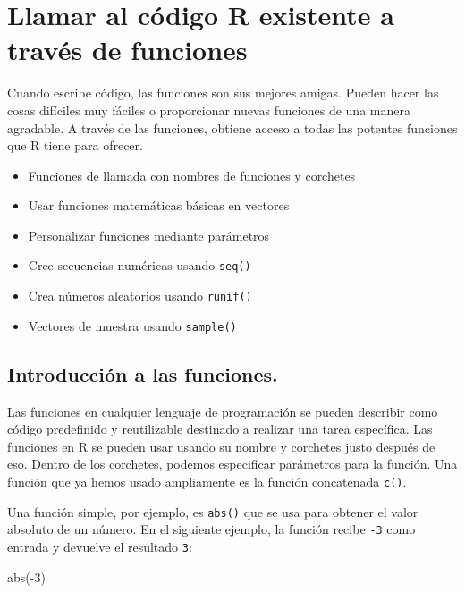 \documentclass[
]{book}
\newenvironment{Shaded}{\begin{snugshade}}{\end{snugshade}}
\newcommand{\DecValTok}[1]{\textcolor[rgb]{0.00,0.00,0.81}{#1}}
\newcommand{\FunctionTok}[1]{\textcolor[rgb]{0.00,0.00,0.00}{#1}}
\newcommand{\NormalTok}[1]{#1}
\newcommand{\SpecialCharTok}[1]{\textcolor[rgb]{0.00,0.00,0.00}{#1}}
\providecommand{\tightlist}{%
  \setlength{\itemsep}{0pt}\setlength{\parskip}{0pt}}
\begin{document}
\hypertarget{llamar-al-cuxf3digo-r-existente-a-travuxe9s-de-funciones}{%
\section{Llamar al código R existente a través de funciones}\label{llamar-al-cuxf3digo-r-existente-a-travuxe9s-de-funciones}}

Cuando escribe código, las funciones son sus mejores amigas. Pueden hacer las cosas difíciles muy fáciles o proporcionar nuevas funciones de una manera agradable. A través de las funciones, obtiene acceso a todas las potentes funciones que R tiene para ofrecer.

\begin{itemize}
\tightlist
\item
  Funciones de llamada con nombres de funciones y corchetes
\item
  Usar funciones matemáticas básicas en vectores
\item
  Personalizar funciones mediante parámetros
\item
  Cree secuencias numéricas usando \texttt{seq()}
\item
  Crea números aleatorios usando \texttt{runif()}
\item
  Vectores de muestra usando \texttt{sample()}
\end{itemize}

\hypertarget{introducciuxf3n-a-las-funciones.}{%
\subsection{Introducción a las funciones.}\label{introducciuxf3n-a-las-funciones.}}

Las funciones en cualquier lenguaje de programación se pueden describir como código predefinido y reutilizable destinado a realizar una tarea específica. Las funciones en R se pueden usar usando su nombre y corchetes justo después de eso. Dentro de los corchetes, podemos especificar parámetros para la función. Una función que ya hemos usado ampliamente es la función concatenada \texttt{c()}.

Una función simple, por ejemplo, es \texttt{abs()} que se usa para obtener el valor absoluto de un número. En el siguiente ejemplo, la función recibe \texttt{-3} como entrada y devuelve el resultado \texttt{3}:

\begin{Shaded}
\begin{Highlighting}[]
\FunctionTok{abs}\NormalTok{(}\SpecialCharTok{{-}}\DecValTok{3}\NormalTok{)}
\end{Highlighting}
\end{Shaded}
\end{document}
